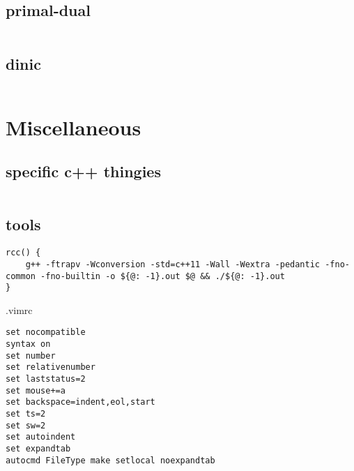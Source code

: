 \documentclass[portrait, 8pt, a4paper, oneside, landscape]{extarticle}
\begin{document}
\subsection{primal-dual}
\inputminted{cpp}{src/primal_dual.cpp}
\subsection{dinic}
\inputminted{cpp}{src/dinic.cpp}

\section{Miscellaneous}
\subsection{specific c++ thingies}
\inputminted{cpp}{src/cpp_utils.cpp}

\subsection{tools}

\begin{verbatim}
rcc() {
    g++ -ftrapv -Wconversion -std=c++11 -Wall -Wextra -pedantic -fno-common -fno-builtin -o ${@: -1}.out $@ && ./${@: -1}.out
}
\end{verbatim}

.vimrc
\begin{verbatim}
set nocompatible
syntax on
set number
set relativenumber
set laststatus=2
set mouse+=a
set backspace=indent,eol,start
set ts=2
set sw=2
set autoindent
set expandtab
autocmd FileType make setlocal noexpandtab
\end{verbatim}
\end{document}
